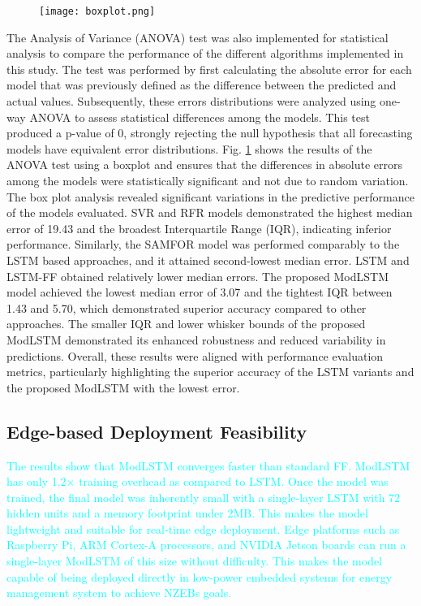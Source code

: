 \documentclass[journal]{IEEEtran}
\begin{document}
\begin{figure}[!h]
		\centering
\texttt{[image: boxplot.png]}
		\caption{ }
		\label{Boxplot}
	\end{figure}


    
 The Analysis of Variance (ANOVA) test was also implemented for statistical analysis to compare the performance of the different algorithms implemented in this study. The test was performed by first calculating the absolute error for each model that was previously defined as the difference between the predicted and actual values.  Subsequently, these errors distributions were analyzed using one-way ANOVA to assess statistical differences among the models. This test produced a p-value of 0, strongly rejecting the null hypothesis that all forecasting models have equivalent error distributions. 
Fig. \ref{Boxplot} shows the results of the ANOVA test using a boxplot and ensures that the differences in absolute errors among the models were statistically significant and not due to random variation. The box plot analysis revealed significant variations in the predictive performance of the models evaluated. SVR and RFR models demonstrated the highest median error of 19.43 and the broadest Interquartile Range (IQR), indicating inferior performance. Similarly, the SAMFOR model was performed comparably to the LSTM based approaches, and it attained second-lowest median error. LSTM and LSTM-FF obtained relatively lower median errors. The proposed ModLSTM model achieved the lowest median error of 3.07 and the tightest IQR between 1.43 and 5.70, which demonstrated superior accuracy compared to other approaches. The smaller IQR and lower whisker bounds of the proposed ModLSTM demonstrated its enhanced robustness and reduced variability in predictions.
 Overall, these results were aligned with performance evaluation metrics, particularly highlighting the superior accuracy of the LSTM variants and the proposed ModLSTM with the lowest error.

\subsection{Edge-based Deployment Feasibility}
\textcolor{cyan}{The results show that ModLSTM converges faster than standard FF. ModLSTM has only 1.2×
training overhead as compared to LSTM. Once the model was trained, the final model was inherently small with a single-layer LSTM with 72 hidden units and a memory footprint under
2MB. This makes the model lightweight and suitable for real-time edge deployment. Edge
platforms such as Raspberry Pi, ARM Cortex-A processors, and NVIDIA Jetson boards can
run a single-layer ModLSTM of this size without difficulty. This makes the model capable of
being deployed directly in low-power embedded systems for energy management system to achieve NZEBs goals.}
\end{document}
